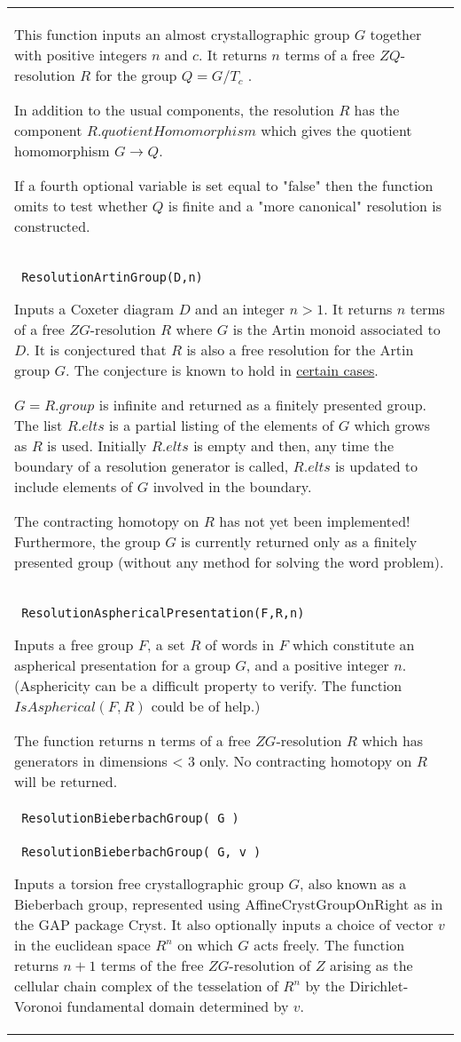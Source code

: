 \documentclass[a4paper,11pt]{report}
\begin{document}
{\begin{center}
\begin{tabular}{|l|}
 This function inputs an almost crystallographic group $G$ together with positive integers $n$ and $c$. It returns $n$ terms of a free $ZQ$-resolution $R$ for the group $Q=G/T_c$ .

 In addition to the usual components, the resolution $R$ has the component $R.quotientHomomorphism$ which gives the quotient homomorphism $G \longrightarrow Q $.

 If a fourth optional variable is set equal to "false" then the function omits
to test whether $Q$ is finite and a "more canonical" resolution is constructed. \\
 \index{ResolutionArtinGroup} \texttt{ ResolutionArtinGroup(D,n)} 

 Inputs a Coxeter diagram $D$ and an integer $n>1$. It returns $n$ terms of a free $ZG$-resolution $R$ where $G$ is the Artin monoid associated to $D$. It is conjectured that $R$ is also a free resolution for the Artin group $G$. The conjecture is known to hold in \href{../www/SideLinks/About/aboutArtinGroups.html} {certain cases}.

 $G=R.group$ is infinite and returned as a finitely presented group. The list $R.elts$ is a partial listing of the elements of $G$ which grows as $R$ is used. Initially $R.elts$ is empty and then, any time the boundary of a resolution generator is called, $R.elts$ is updated to include elements of $G$ involved in the boundary.

 The contracting homotopy on $R$ has not yet been implemented! Furthermore, the group $G$ is currently returned only as a finitely presented group (without any method
for solving the word problem). \\
 \index{ResolutionAsphericalPresentation} \texttt{ ResolutionAsphericalPresentation(F,R,n)} 

 Inputs a free group $F$, a set $R$ of words in $F$ which constitute an aspherical presentation for a group $G$, and a positive integer $n$. (Asphericity can be a difficult property to verify. The function $IsAspherical(F,R)$ could be of help.)

 The function returns n terms of a free $ZG$-resolution $R$ which has generators in dimensions {\textless} 3 only. No contracting homotopy
on $R$ will be returned. \\
 \index{ResolutionBieberbachGroup (HAPcryst)} \texttt{ ResolutionBieberbachGroup( G ) } \\
 \texttt{ ResolutionBieberbachGroup( G, v ) } 

 Inputs a torsion free crystallographic group $G$, also known as a Bieberbach group, represented using AffineCrystGroupOnRight
as in the GAP package Cryst. It also optionally inputs a choice of vector $v$ in the euclidean space $R^n$ on which $G$ acts freely. The function returns $n+1$ terms of the free $ZG$-resolution of $Z$ arising as the cellular chain complex of the tesselation of $R^n$ by the Dirichlet-Voronoi fundamental domain determined by $v$. 


\end{tabular}
\end{center}}
\end{document}
